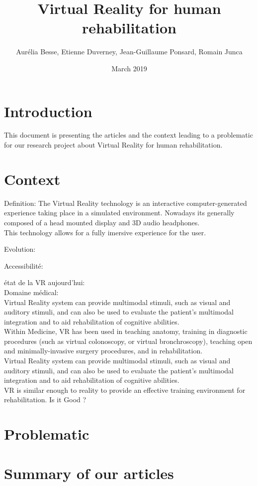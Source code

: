 \documentclass{article}
\title{Virtual Reality for human rehabilitation}
\author{ Aurélia Besse, Etienne Duverney, Jean-Guillaume Ponsard, Romain Junca }
\date{March 2019}
\begin{document}
\maketitle

\section{Introduction}

This document is presenting the articles and the context leading to a problematic for our research project about Virtual Reality for human rehabilitation.


\section{Context}

Definition:
The Virtual Reality technology is an interactive computer-generated experience taking place in a simulated environment. Nowadays its generally composed of a head mounted display and 3D audio headphones. \\
This technology allows for a fully imersive experience for the user.

Evolution:


Accessibilité:


état de la VR aujourd'hui: \\



Domaine médical: \\
Virtual Reality system can provide multimodal stimuli, such as visual and auditory stimuli, and can also be used to evaluate the patient’s multimodal integration and to aid rehabilitation of cognitive abilities. \\
Within Medicine, VR has been used in teaching anatomy, training in diagnostic procedures (such as virtual colonoscopy, or virtual bronchroscopy), teaching open and minimally-invasive surgery procedures, and in rehabilitation. \\
Virtual Reality system can provide multimodal stimuli, such as visual and auditory stimuli, and can also be used to evaluate the patient’s multimodal integration and to aid rehabilitation of cognitive abilities. \\

VR is similar enough to reality to provide an effective training environment for rehabilitation. 
Is it Good ?


\section{Problematic}


\section{Summary of our articles}
\end{document}
